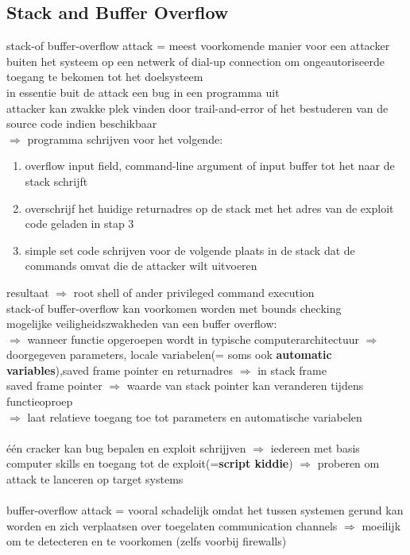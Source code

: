 \documentclass{report}
\begin{document}
\subsection{Stack and Buffer Overflow}
stack-of buffer-overflow attack = meest voorkomende manier voor een attacker buiten het systeem op een netwerk of dial-up connection om ongeautoriseerde toegang te bekomen tot het doelsysteem
\\in essentie buit de attack een bug in een programma uit
\\attacker kan zwakke plek vinden door trail-and-error of het bestuderen van de source code indien beschikbaar
\\ $\Rightarrow$ programma schrijven voor het volgende:
\begin{enumerate}
\item overflow input field, command-line argument of input buffer tot het naar de stack schrijft
\item overschrijf het huidige returnadres op de stack met het adres van de exploit code geladen in stap 3
\item simple set code schrijven voor de volgende plaats in de stack dat de commands omvat die de attacker wilt uitvoeren
\end{enumerate}
resultaat $\Rightarrow$ root shell of ander privileged command execution
\\stack-of buffer-overflow kan voorkomen worden met bounds checking
\\mogelijke veiligheidszwakheden van een buffer overflow:
\\$\Rightarrow$ wanneer functie opgeroepen wordt in typische computerarchitectuur $\Rightarrow$ doorgegeven parameters, locale variabelen(= soms ook \textbf{automatic variables}),saved frame pointer en returnadres $\Rightarrow$ in stack frame
\\saved frame pointer $\Rightarrow$ waarde van stack pointer kan veranderen tijdens functieoproep 
\\$\Rightarrow$ laat relatieve toegang toe tot parameters en automatische variabelen
\\
\\\'e\'en cracker kan bug bepalen en exploit schrijjven $\Rightarrow$ iedereen met basis computer skills en toegang tot de exploit(=\textbf{script kiddie}) $\Rightarrow$ proberen om attack te lanceren op target systems
\\
\\buffer-overflow attack = vooral schadelijk omdat het tussen systemen gerund kan worden en zich verplaatsen over toegelaten communication channels $\Rightarrow$ moeilijk om te detecteren en te voorkomen (zelfs voorbij firewalls)
\end{document}
